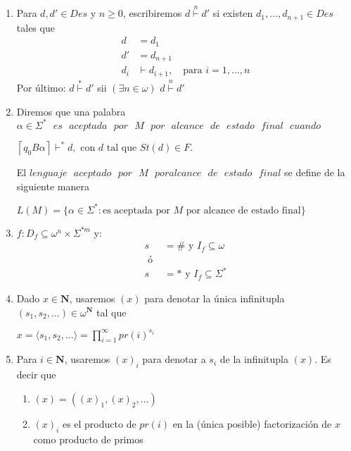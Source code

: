 \documentclass{article}
\begin{document}
\begin{enumerate}
        \item Para $d, d' \in Des$ y $n \geq 0$, escribiremos $d \overset{n}{\vdash} d'$
        si existen $d_1, \dots, d_{n+1} \in Des$ tales que 
        \begin{align*}
                d &= d_1 \\
                d' &= d_{n+1} \\
                d_i &\vdash d_{i+1}, \quad \text{para } i = 1, \ldots, n
        \end{align*}
        Por último: $d \overset{*}{\vdash} d'$ sii $(\exists n \in \omega)$ $d \overset{n}{\vdash} d'$

        \item Diremos que una palabra $\alpha \in \Sigma^{*} \text{ } es \text{ } 
        aceptada \text{ } por \text{ } M \text{ } por \text{ } alcance \text{ }
        de \text{ } estado \text{ } final \text{ } cuando$
        \begin{center}
                $\left\lceil q_0 B \alpha \right\rceil \vdash^* d, 
                \text{ con } d \text{ tal que } St(d) \in F.$
        \end{center}
        El $lenguaje \text{ } aceptado \text{ } por \text{ } M \text{ } por alcance
        \text{ } de \text{ } estado \text{ } final$ se define de la siguiente manera
        \begin{center}
                $L(M) = \{ \alpha \in \Sigma^{*}: \text{es aceptada por } M \text{ por 
                alcance de estado final}\}$
        \end{center}

        \item $f : D_f \subseteq \omega^n \times \Sigma^{*m}$ y:
        \begin{align*}
                s &= \# \text{ y } I_f \subseteq \omega \\
                \text{ ó } \\
                s &= * \text{ y } I_f \subseteq \Sigma^{*}
        \end{align*}

        \item Dado $x \in \mathbf{N}$, usaremos $(x)$ para denotar la única infinitupla
        $(s_1, s_2, \dots) \in \omega^{\mathbf{N}}$ tal que
        \begin{center}
                $x = \langle s_1, s_2, \dots \rangle = \displaystyle \prod_{i=1}^{\infty} pr(i)^{s_i}$
        \end{center}

        \item Para $i \in \mathbf{N}$, usaremos $(x)_i$ para denotar a $s_i$ de la infinitupla
        $(x)$. Es decir que 
        \begin{enumerate}
                \item $(x) = ((x)_1, (x)_2, \dots)$
                \item $(x)_i$ es el producto de $pr(i)$ en la (única posible) factorización de 
                $x$ como producto de primos
                
        \end{enumerate}
\end{enumerate}
\end{document}
